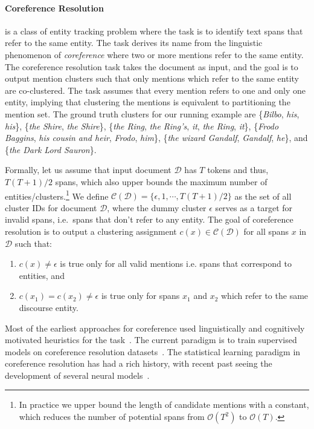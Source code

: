 \documentclass[12pt]{thesis-umich}[thesis]
\begin{document}
\paragraph{Coreference Resolution} is a class of entity tracking problem where the task is to identify text spans that refer to the same entity. The task derives its name from the linguistic phenomenon of \emph{coreference} where two or more mentions refer to the same entity. The coreference resolution task takes the document as input, and the goal is to output mention clusters such that only mentions which refer to the same entity are co-clustered. The task assumes that every mention refers to one and only one entity, implying that clustering the mentions is equivalent to partitioning the mention set. The ground truth clusters for our running example are \{\emph{Bilbo}, \emph{his}, \emph{his}\},  \{\emph{the Shire}, \emph{the Shire}\}, \{\emph{the Ring}, \emph{the Ring's}, \emph{it}, \emph{the Ring}, \emph{it}\},  \{\emph{Frodo Baggins}, \emph{his cousin and heir}, \emph{Frodo}, \emph{him}\}, \{\emph{the wizard Gandalf}, \emph{Gandalf}, \emph{he}\}, and \{\emph{the Dark Lord Sauron}\}. 

Formally, let us assume that input document $\mathcal{D}$ has $T$ tokens and thus, $T(T + 1) / 2$ spans, which also upper bounds the maximum number of entities/clusters.\footnote{In practice we upper bound the length of candidate mentions with a constant, which reduces the number of potential spans from $\mathcal{O}(T^2)$ to $\mathcal{O}(T)$.}
We define $\mathcal{C}(\mathcal{D}) = \{\epsilon, 1, \cdots, T(T + 1) / 2\}$ as the set of all cluster IDs for document $\mathcal{D}$, where the dummy cluster $\epsilon$ serves as a target for invalid spans, i.e.\ spans that don't refer to any entity. The goal of coreference resolution is to output a clustering assignment $ c(x) \in \mathcal{C}(\mathcal{D})$ for all spans $x$ in $\mathcal{D}$  such that:
\begin{enumerate}
	\item $c(x) \ne  \epsilon$ is true only for all valid mentions i.e. spans that correspond to entities, and  
	\item  $c(x_1) = c(x_2) \ne \epsilon$ is true only for spans $x_1$ and $x_2$ which refer to the same discourse entity.
\end{enumerate}

Most of the earliest approaches for coreference used linguistically and cognitively motivated heuristics for the task~\citep{Hobbs1978ResolvingPR, brennan87centering, Carter1987InterpretingAI}.  
The current paradigm is to train supervised models on coreference resolution datasets~\citep{weischedel2013ontonotes, webster2018gap, bamman2019annotated}.
The statistical learning paradigm in coreference resolution has had a rich history, with recent past seeing the development of several neural models~\citep{wiseman-etal-2015-learning,clark-manning-2016-deep,lee-etal-2017-end,lee-etal-2018-higher, joshi-etal-2019-bert, joshi-etal-2020-spanbert, wu2019coreference}. 
\end{document}
